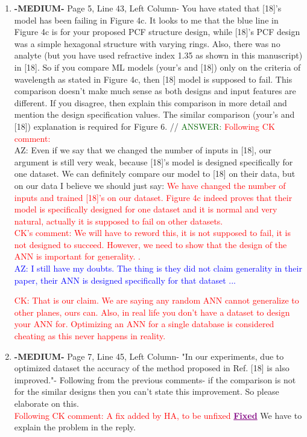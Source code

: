 \documentclass{article}
\newcommand{\fixed}{\Large \textcolor{purple}{ \underline{\textbf{Fixed}} }}
\begin{document}
\begin{enumerate}
 \item \textbf{-MEDIUM-} Page 5, Line 43, Left Column- You have stated that [18]'s model has been failing in Figure 4c. It looks to me that the blue line in Figure 4c is for your proposed PCF structure design, while [18]'s PCF design was a simple hexagonal structure with varying rings. Also, there was no analyte (but you have used refractive index 1.35 as shown in this manuscript) in [18]. So if you compare ML models (your's and [18]) only on the criteria of wavelength as stated in Figure 4c, then [18] model is supposed to fail. This comparison doesn't make much sense as both designs and input features are different. If you disagree, then explain this comparison in more detail and mention the design specification values.
The similar comparison (your's and [18]) explanation is required for Figure 6. //
\textcolor{darkgreen}{ANSWER:} \textcolor{red}{Following CK comment: } \\ AZ: Even if we say that we changed the number of inputs in [18], our argument is still very weak, because [18]'s model is designed specifically for one dataset. We can definitely compare our model to [18] on their data, but on our data I believe we should just say: \textcolor{red} {We have changed the number of inputs and trained [18]'s on our dataset. Figure 4c indeed proves that their model is specifically designed for one dataset and it is normal and very natural, actually it is supposed to fail on other datasets.} \\ \textcolor{red}{CK's comment: We will have to reword this, it is not supposed to fail, it is not designed to succeed. However, we need to show that the design of the ANN is important for generality. .} \\ \textcolor{blue}{AZ: I still have my doubts. The thing is they did not claim generality in their paper, their ANN is designed specifically for that dataset ...} 

\textcolor{red}{CK: That is our claim. We are saying any random ANN cannot generalize to other planes, ours can. Also, in real life you don't have a dataset to design your ANN for. Optimizing an ANN for a single database is considered cheating as this never happens in reality.}

\item \textbf{-MEDIUM-} Page 7, Line 45, Left Column- "In our experiments, due to optimized dataset the accuracy of the method proposed in Ref. [18] is also improved."- Following from the previous comments- if the comparison is not for the similar designs then you can't state this improvement. So please elaborate on this. \\
\textcolor{red}{Following CK comment: A fix added by HA, to be unfixed}
\fixed{} We have to explain the problem in the reply.


\end{enumerate}
\end{document}
